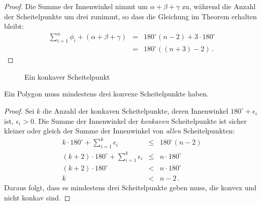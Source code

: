 \begin{proof}
Die Summe der Innenwinkel nimmt um $\alpha+\beta+\gamma$ zu, während die Anzahl der Scheitelpunkte um drei zunimmt, so dass die Gleichung im Theorem erhalten bleibt:
\begin{eqnarray*}
\displaystyle\sum_{i=1}^n \phi_i + (\alpha + \beta + \gamma) &=& 180^\circ(n-2)+3\cdot 180^\circ\\
&=& 180^\circ((n+3)-2)\,.
\end{eqnarray*}
\end{proof}

\begin{figure}[t]
\begin{center}
\end{center}
\caption{Ein konkaver Scheitelpunkt}\label{f.museum.concave}
\end{figure}


\begin{theorem}\label{thm.convex}
Ein Polygon muss mindestens drei konvexe Scheitelpunkte haben.
\end{theorem}

\begin{proof}
Sei $k$ die Anzahl der konkaven Scheitelpunkte, deren Innenwinkel $180^\circ+\epsilon_i$ ist, $\epsilon_i>0$. Die Summe der Innenwinkel der \emph{konkaven} Scheitelpunkte ist sicher kleiner oder gleich der Summe der Innenwinkel von \emph{allen} Scheitelpunkten:
\begin{eqnarray*}
k\cdot 180^\circ +\displaystyle\sum_{i=1}^{k}\epsilon_i &\leq& 180^\circ(n-2)\\
(k+2)\cdot 180^\circ +\displaystyle\sum_{i=1}^{k}\epsilon_i &\leq& n\cdot 180^\circ\\
(k+2)\cdot 180^\circ &<& n\cdot 180^\circ\\
k&<&n-2\,.
\end{eqnarray*}
Daraus folgt, dass es mindestens drei Scheitelpunkte geben muss, die konvex und nicht konkav sind.
\end{proof}


